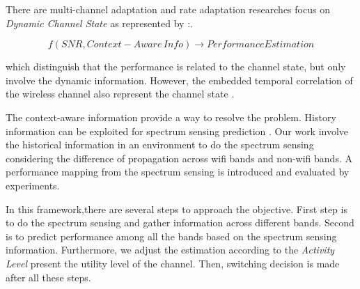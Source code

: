 
There are multi-channel adaptation and rate adaptation researches focus on \emph{Dynamic Channel State} as represented by \cite{cordeiro2007c,MOAR}:. 

\begin{equation}
f(SNR,Context-Aware\, Info) \rightarrow Performance Estimation
\end{equation}

which distinguish that the performance is related to the channel state, but only involve the dynamic information. 
However, the embedded temporal correlation of the wireless channel also represent the channel state \cite{liuastra}. 


The context-aware information provide a way to resolve the problem. History information can be exploited for spectrum sensing prediction \cite{yucek2009survey}.
Our work involve the historical information in an environment to do the spectrum sensing considering the difference of propagation across wifi bands and non-wifi bands. 
A performance mapping from the spectrum sensing is introduced and evaluated by experiments.



In this framework,there are several steps to approach the objective. 
First step is to do the spectrum sensing and gather information across different bands. 
Second is to predict performance among all the bands based on the spectrum sensing information. 
Furthermore, we adjust the estimation according to the \emph{Activity Level} present the utility level of the channel.
Then, switching decision is made after all these steps.





